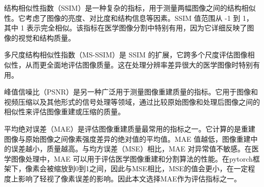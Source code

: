 \documentclass[twocolumn]{article}
\begin{document}
结构相似性指数（SSIM）是一种复杂的指标，用于测量两幅图像之间的结构相似性。它考虑了图像的亮度、对比度和结构信息等因素。SSIM 值范围从 -1 到 1，其中 1 表示完全相似。该指标在医学图像分割中特别有用，因为它详细反映了图像的视觉和结构质量。

多尺度结构相似性指数（MS-SSIM）是 SSIM 的扩展，它跨多个尺度评估图像相似性，从而更全面地评估图像质量。这在处理分辨率差异很大的医学图像时特别有用。

峰值信噪比（PSNR）是另一种广泛用于测量图像重建质量的指标。它用于图像和视频压缩以及其他形式的信号处理等领域，通过比较原始图像和处理后图像之间的相似性来评估图像重建或压缩的质量。

平均绝对误差（MAE）是评估图像重建质量最常用的指标之一。它计算的是重建图像与原始图像之间像素强度差异的绝对值的平均值。MAE 值越低，图像重建中的误差越小，质量越高。与均方误差（MSE）相比，MAE 对异常值不敏感。在医学图像处理中，MAE 可以用于评估医学图像重建和分割算法的性能。在pytorch框架下，像素会被缩放到0到1之间，因此与MSE相比，MSE的值会更小，在一定程度上影响了轻视了像素误差的影响。因此本文选择MAE作为评估指标之一。





\end{document}
